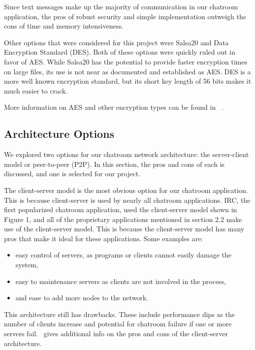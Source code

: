 \documentclass{article}
\begin{document}
Since text messages make up the majority of communication in our chatroom application, the pros of robust security and simple implementation outweigh the cons of time and memory intensiveness. 

Other options that were considered for this project were Salsa20 and Data Encryption Standard (DES). Both of these options were quickly ruled out in favor of AES. While Salsa20 has the potential to provide faster encryption times on large files, its use is not near as documented and established as AES. DES is a more well known encryption standard, but its short key length of 56 bits makes it much easier to crack. 

More information on AES and other encryption types can be found in ~\cite{encryption}.

\subsection{Architecture Options}

We explored two options for our chatroom network architecture: the server-client model or peer-to-peer (P2P). In this section, the pros and cons of each is discussed, and one is selected for our project. 

The client-server model is the most obvious option for our chatroom application. This is because client-server is used by nearly all chatroom applications. IRC, the first popularized chatroom application, used the client-server model shown in Figure 1, and all of the proprietary applications mentioned in section 2.2 make use of the client-server model. This is because the client-server model has many pros that make it ideal for these applications. Some examples are: 

\begin{itemize}
  \item easy control of servers, as programs or clients cannot easily damage the system,
  \item easy to maintenance servers as clients are not involved in the process,
  \item and ease to add more nodes to the network.
\end{itemize}

This architecture still has drawbacks. These include performance dips as the number of clients increase and potential for chatroom failure if one or more servers fail.~\cite{clientserver} gives additional info on the pros and cons of the client-server architecture.
\end{document}
